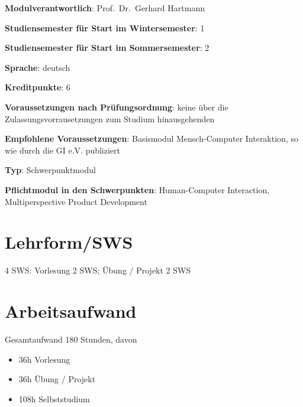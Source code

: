 \begin{modulHead}
\textbf{Modulverantwortlich}: Prof.~Dr.~Gerhard
Hartmann
\end{modulHead}
\begin{modulHead}
\textbf{Studiensemester für
Start im Wintersemester}:
1
\end{modulHead}
\begin{modulHead}
\textbf{Studiensemester für Start
im Sommersemester}:
2
\end{modulHead}
\begin{modulHead}
\textbf{Sprache}:
deutsch
\end{modulHead}
\begin{modulHead}
\textbf{Kreditpunkte}:
6
\end{modulHead}
\begin{modulHead}
\textbf{Voraussetzungen nach
Prüfungsordnung}: keine über die Zulassungsvorrausetzungen zum Studium
hinausgehenden
\end{modulHead}
\begin{modulHead}
\textbf{Empfohlene
Voraussetzungen}: Basismodul Mensch-Computer Interaktion, so wie durch
die GI e.V. publiziert
\end{modulHead}
\begin{modulHead}
\textbf{Typ}:
Schwerpunktmodul
\end{modulHead}
\begin{modulHead}
\textbf{Pflichtmodul
in den Schwerpunkten}: Human-Computer Interaction, Multiperspective
Product Development
\end{modulHead}


\section*{Lehrform/SWS\label{/mi-2017/modulbeschreibungen-master/MA_HCI_InteractionDesign}}\label{lehrformswspathlabelmi-2017modulbeschreibungen-mastermaux5fhciux5finteractiondesign}

4 SWS: Vorlesung 2 SWS; Übung / Projekt 2 SWS

\section*{Arbeitsaufwand\label{/mi-2017/modulbeschreibungen-master/MA_HCI_InteractionDesign}}\label{arbeitsaufwandpathlabelmi-2017modulbeschreibungen-mastermaux5fhciux5finteractiondesign}

Gesamtaufwand 180 Stunden, davon

\begin{itemize}
\tightlist
\item
  36h Vorlesung
\item
  36h Übung / Projekt
\item
  108h Selbststudium
\end{itemize}

